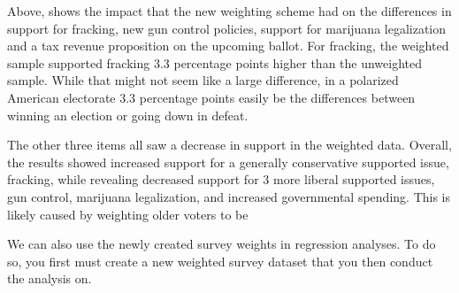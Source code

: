 \documentclass[
  letterpaper,
  DIV=11,
  numbers=noendperiod]{scrreprt}
\newenvironment{Shaded}{\begin{snugshade}}{\end{snugshade}}
\newcommand{\AttributeTok}[1]{\textcolor[rgb]{0.40,0.45,0.13}{#1}}
\newcommand{\CommentTok}[1]{\textcolor[rgb]{0.37,0.37,0.37}{#1}}
\newcommand{\ConstantTok}[1]{\textcolor[rgb]{0.56,0.35,0.01}{#1}}
\newcommand{\DecValTok}[1]{\textcolor[rgb]{0.68,0.00,0.00}{#1}}
\newcommand{\FunctionTok}[1]{\textcolor[rgb]{0.28,0.35,0.67}{#1}}
\newcommand{\NormalTok}[1]{\textcolor[rgb]{0.00,0.23,0.31}{#1}}
\newcommand{\OtherTok}[1]{\textcolor[rgb]{0.00,0.23,0.31}{#1}}
\newcommand{\SpecialCharTok}[1]{\textcolor[rgb]{0.37,0.37,0.37}{#1}}
\newcommand{\StringTok}[1]{\textcolor[rgb]{0.13,0.47,0.30}{#1}}
\begin{document}
Above, shows the impact that the new weighting scheme had on the
differences in support for fracking, new gun control policies, support
for marijuana legalization and a tax revenue proposition on the upcoming
ballot. For fracking, the weighted sample supported fracking 3.3
percentage points higher than the unweighted sample. While that might
not seem like a large difference, in a polarized American electorate 3.3
percentage points easily be the differences between winning an election
or going down in defeat.

The other three items all saw a decrease in support in the weighted
data. Overall, the results showed increased support for a generally
conservative supported issue, fracking, while revealing decreased
support for 3 more liberal supported issues, gun control, marijuana
legalization, and increased governmental spending. This is likely caused
by weighting older voters to be

We can also use the newly created survey weights in regression analyses.
To do so, you first must create a new weighted survey dataset that you
then conduct the analysis on.

\begin{Shaded}
\end{Shaded}
\end{document}
